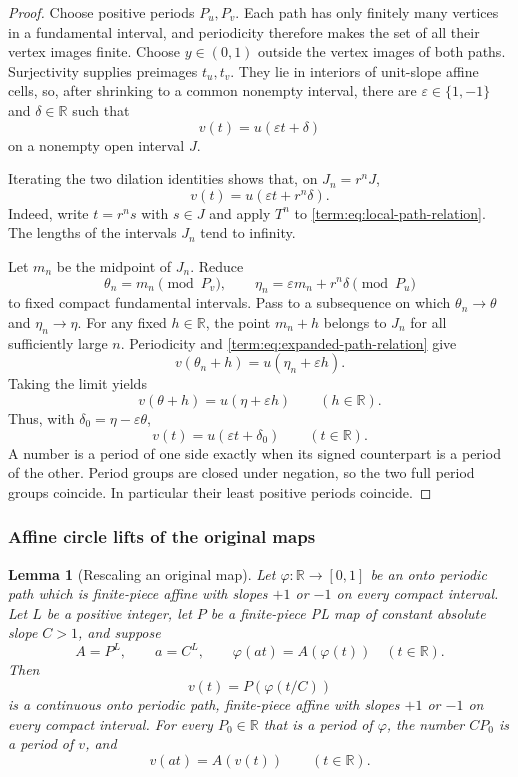 \documentclass[11pt]{article}
\newtheorem{lemma}[theorem]{Lemma}
\theoremstyle{definition}
\theoremstyle{remark}
\newcommand{\I}{[0,1]}
\begin{document}
\begin{proof}
Choose positive periods \(P_u,P_v\).  Each path has only finitely many
vertices in a fundamental interval, and periodicity therefore makes the set
of all their vertex images finite.  Choose \(y\in(0,1)\) outside the vertex
images of both paths.
Surjectivity supplies preimages \(t_u,t_v\).  They lie in interiors of
unit-slope affine cells, so, after shrinking to a common nonempty interval,
there are
$\varepsilon\in\{1,-1\}$ and $\delta\in\mathbb R$ such that
\begin{equation}\label{term:eq:local-path-relation}
 v(t)=u(\varepsilon t+\delta)
\end{equation}
on a nonempty open interval $J$.

Iterating the two dilation identities shows that, on $J_n=r^nJ$,
\begin{equation}\label{term:eq:expanded-path-relation}
 v(t)=u(\varepsilon t+r^n\delta).
\end{equation}
Indeed, write $t=r^ns$ with $s\in J$ and apply $T^n$ to
\eqref{term:eq:local-path-relation}.  The lengths of the intervals $J_n$
tend to infinity.

Let $m_n$ be the midpoint of $J_n$.  Reduce
\[
 \theta_n=m_n\pmod {P_v},\qquad
 \eta_n=\varepsilon m_n+r^n\delta\pmod {P_u}
\]
to fixed compact fundamental intervals.  Pass to a subsequence on which
$\theta_n\to\theta$ and $\eta_n\to\eta$.  For any fixed
$h\in\mathbb R$, the point $m_n+h$ belongs to $J_n$ for all sufficiently
large $n$.  Periodicity and \eqref{term:eq:expanded-path-relation} give
\[
 v(\theta_n+h)=u(\eta_n+\varepsilon h).
\]
Taking the limit yields
\[
 v(\theta+h)=u(\eta+\varepsilon h)
 \qquad(h\in\mathbb R).
\]
Thus, with $\delta_0=\eta-\varepsilon\theta$,
\[
 v(t)=u(\varepsilon t+\delta_0)\qquad(t\in\mathbb R).
\]
A number is a period of one side exactly when its signed counterpart is a
period of the other.  Period groups are closed under negation, so the two
full period groups coincide.  In particular their least positive periods
coincide.
\end{proof}

\subsubsection{Affine circle lifts of the original maps}

\begin{lemma}[Rescaling an original map]\label{term:lem:rescaled-original-path}
Let \(\varphi:\mathbb R\to\I\) be an onto periodic path which is
finite-piece affine with slopes \(+1\) or \(-1\) on every compact interval.
Let \(L\) be a positive integer, let \(P\) be a finite-piece PL map of
constant absolute slope \(C>1\), and suppose
\[
 A=P^L,\qquad a=C^L,\qquad
 \varphi(at)=A(\varphi(t))\quad(t\in\mathbb R).
\]
Then
\[
 v(t)=P(\varphi(t/C))
\]
is a continuous onto periodic path, finite-piece affine with slopes
\(+1\) or \(-1\) on every compact interval.  For every
\(P_0\in\mathbb R\) that is a period of \(\varphi\), the number \(CP_0\) is
a period of \(v\), and
\[
 v(at)=A(v(t))\qquad(t\in\mathbb R).
\]
\end{lemma}
\end{document}
